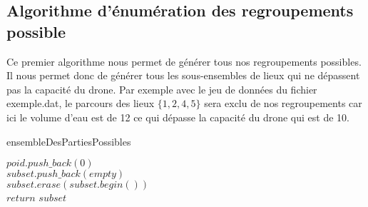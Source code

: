 \documentclass[a4paper,sffamily,12pt]{article}
\begin{document}
		\vspace{0.5cm}
		
		\subsection{Algorithme d'énumération des regroupements possible}
			
			\vspace{0.5cm}

			Ce premier algorithme nous permet de générer tous nos regroupements possibles. Il nous permet donc de générer tous les sous-ensembles de lieux qui ne dépassent pas la capacité du drone. Par exemple avec le jeu de données du fichier exemple.dat, le parcours des lieux $\{1,2,4,5\}$ sera exclu de nos regroupements car ici le volume d'eau est de 12 ce qui dépasse la capacité du drone qui est de 10.

			\newpage 

			\IncMargin{1em}
			\begin{algorithm}
				\caption{ensembleDesPartiesPossibles}				
				\BlankLine
				$poid.push\_back(0)$\\
				$subset.push\_back(empty)$\\
				$subset.erase(subset.begin())$\\
				$return$ $subset$ \\
			\end{algorithm}\DecMargin{1em}
\end{document}
